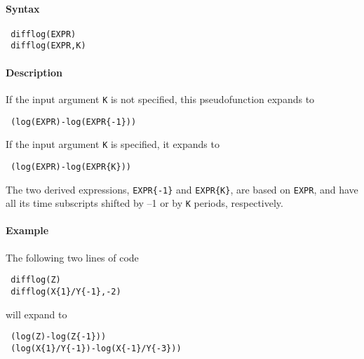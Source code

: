 


	\paragraph{Syntax}
 
 \begin{verbatim}
 difflog(EXPR)
 difflog(EXPR,K)
 \end{verbatim}
 
 \paragraph{Description}
 
 If the input argument \texttt{K} is not specified, this pseudofunction
 expands to
 
 \begin{verbatim}
 (log(EXPR)-log(EXPR{-1}))
 \end{verbatim}
 
 If the input argument \texttt{K} is specified, it expands to
 
 \begin{verbatim}
 (log(EXPR)-log(EXPR{K}))
 \end{verbatim}
 
 The two derived expressions, \texttt{EXPR\{-1\}} and \texttt{EXPR\{K\}},
 are based on \texttt{EXPR}, and have all its time subscripts shifted by
 --1 or by \texttt{K} periods, respectively.
 
 \paragraph{Example}
 
 The following two lines of code
 
 \begin{verbatim}
 difflog(Z)
 difflog(X{1}/Y{-1},-2)
 \end{verbatim}
 
 will expand to
 
 \begin{verbatim}
 (log(Z)-log(Z{-1}))
 (log(X{1}/Y{-1})-log(X{-1}/Y{-3}))
 \end{verbatim}


